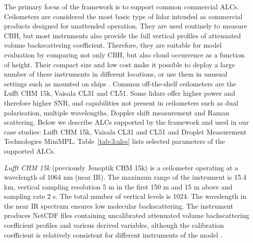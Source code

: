 The primary focus of the framework is to support common commercial ALCs.
Ceilometers are considered the most basic type of lidar \citep{emeis2010,kotthaus2016}
intended as commercial products designed for unattended operation.
They are used routinely to measure CBH, but most instruments also provide the
full vertical profiles of attenuated volume backscattering coefficient. Therefore, they are suitable for model
evaluation by comparing not only CBH, but also cloud occurrence as a function
of height. Their compact size and low cost make it possible to deploy a large
number of these instruments in different locations, or use them in unusual settings
such as mounted on ships \citep{klekociuk2020,kuma2020a}. Common off-the-shelf
ceilometers are
the Lufft CHM 15k, Vaisala CL31 and CL51.
Some lidars offer higher power
and therefore higher SNR, and capabilities not present in ceilometers such as
dual polarisation, multiple wavelengths, Doppler shift measurement and Raman scattering.
Below we describe ALCs supported by the framework and used in our case studies:
Lufft CHM 15k, Vaisala CL31 and CL51 and Droplet Measurement Technologies MiniMPL.
Table~\ref{tab:3:alcs} lists selected parameters of the supported ALCs.

\textit{Lufft CHM 15k} (previously Jenoptik CHM 15k) is a ceilometer operating
at a wavelength of 1064 nm (near IR). The maximum range of the instrument is 15.4 km, vertical sampling
resolution 5 m in the first 150 m and 15 m above and sampling rate 2 s.
The total number of vertical levels is 1024.
The wavelength in the near IR
spectrum ensures low molecular backscattering.
The instrument produces NetCDF files containing uncalibrated attenuated
volume backscattering coefficient profiles and various derived variables,
although the calibration coefficient is relatively consistent for different
instruments of the model \citep[Fig. 13]{hopkin2019}.

